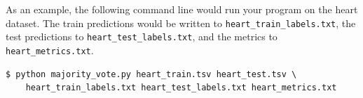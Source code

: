 \documentclass[11pt,addpoints,answers]{exam}
\begin{document}
As an example, the following command line would run your program on the heart dataset. The train predictions would be written to \lstinline{heart_train_labels.txt}, the test predictions to \lstinline{heart_test_labels.txt}, and the metrics to \lstinline{heart_metrics.txt}.
%
\begin{lstlisting}[language=Shell]
$ python majority_vote.py heart_train.tsv heart_test.tsv \ 
    heart_train_labels.txt heart_test_labels.txt heart_metrics.txt
\end{lstlisting}








\end{document}
